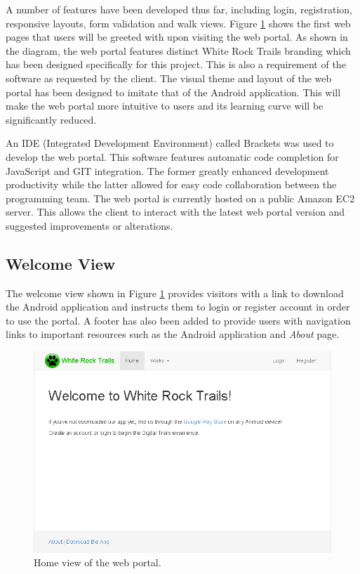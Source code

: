 \documentclass[11pt,a4paper]{article}
\begin{document}
A number of features have been developed thus far, including login, registration, responsive layouts, form validation and walk views. Figure \ref{fig:home} shows the first web pages that users will be greeted with upon visiting the web portal. As shown in the diagram, the web portal features distinct White Rock Trails branding which has been designed specifically for this project. This is also a requirement of the software as requested by the client. The visual theme and layout of the web portal has been designed to imitate that of the Android application. This will make the web portal more intuitive to users and its learning curve will be significantly reduced.

An IDE (Integrated Development Environment) called Brackets was used to develop the web portal. This software features automatic code completion for JavaScript and GIT integration. The former greatly enhanced development productivity while the latter allowed for easy code collaboration between the programming team. The web portal is currently hosted on a public Amazon EC2 server. This allows the client to interact with the latest web portal version and suggested improvements or alterations.

\subsection{Welcome View}

The welcome view shown in Figure \ref{fig:home} provides visitors with a link to download the Android application and instructs them to login or register account in order to use the portal. A footer has also been added to provide users with navigation links to important resources such as the Android application and \emph{About} page.

\begin{figure}[H]
\centering
\includegraphics[width=0.8\linewidth]{./img/webportal/home}
\caption{Home view of the web portal.}
\label{fig:home}
\end{figure}
\end{document}

